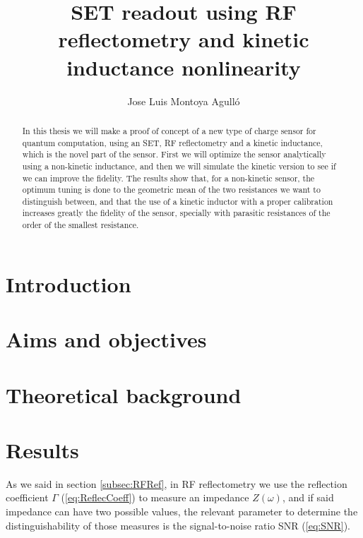 \documentclass{article}
\title{
\textbf{SET readout using RF reflectometry and kinetic inductance nonlinearity}
}
\author{Jose Luis Montoya Agull\'o}
\date{}
\numberwithin{equation}{section}
\begin{document}
\maketitle
\begin{abstract}
    In this thesis we will make a proof of concept of a new type of charge sensor for quantum computation,
    using an SET, RF reflectometry and a kinetic inductance, which is the novel
    part of the sensor. First we will optimize the sensor analytically using a non-kinetic inductance,
    and then we will simulate the kinetic version to see if we can improve the fidelity.
    The results show that, for a non-kinetic sensor, the optimum tuning is done to
    the geometric mean of the two resistances we want to distinguish between, and
    that the use of a kinetic inductor with a proper calibration increases greatly
    the fidelity of the sensor, specially with parasitic resistances of the order
    of the smallest resistance.
\end{abstract}


\tableofcontents{}
\restoregeometry{}

\newpage
\section{Introduction}
\label{sec:Intro}


\section{Aims and objectives}
\label{sec:Objectives}


\newpage
\section{Theoretical background}
\label{sec:Theory}


\newpage
\section{Results}
\label{sec:Results}
As we said in section \ref{subsec:RFRef}, in RF reflectometry we use
the reflection coefficient \(\Gamma\) (\ref{eq:ReflecCoeff}) to measure an
impedance \(Z(\omega)\), and if said impedance can have two possible values,
the relevant parameter to determine the distinguishability of those measures
is the signal-to-noise ratio SNR (\ref{eq:SNR}).
\end{document}

